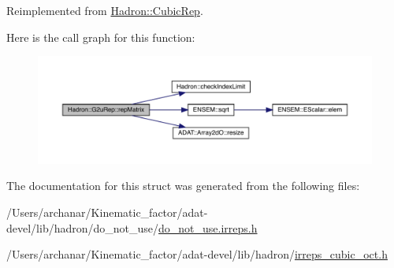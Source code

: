 Reimplemented from \mbox{\hyperlink{structHadron_1_1CubicRep_ac5d7e9e6f4ab1158b5fce3e4ad9e8005}{Hadron\+::\+Cubic\+Rep}}.

Here is the call graph for this function\+:
\nopagebreak
\begin{figure}[H]
\begin{center}
\leavevmode
\includegraphics[width=350pt]{dc/dc0/structHadron_1_1G2uRep_ac35dd43af2c4b6f32d9d3511b2500230_cgraph}
\end{center}
\end{figure}


The documentation for this struct was generated from the following files\+:\begin{DoxyCompactItemize}
\item 
/\+Users/archanar/\+Kinematic\+\_\+factor/adat-\/devel/lib/hadron/do\+\_\+not\+\_\+use/\mbox{\hyperlink{adat-devel_2lib_2hadron_2do__not__use_2do__not__use_8irreps_8h}{do\+\_\+not\+\_\+use.\+irreps.\+h}}\item 
/\+Users/archanar/\+Kinematic\+\_\+factor/adat-\/devel/lib/hadron/\mbox{\hyperlink{adat-devel_2lib_2hadron_2irreps__cubic__oct_8h}{irreps\+\_\+cubic\+\_\+oct.\+h}}\end{DoxyCompactItemize}
